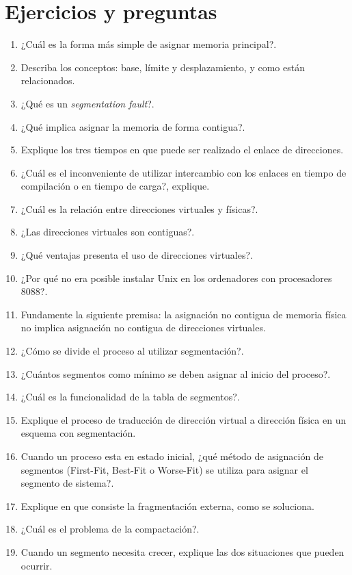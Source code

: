 \section{Ejercicios y preguntas}
\begin{enumerate}
	\item ¿Cuál es la forma más simple de asignar memoria principal?.
	\item Describa los conceptos: base, límite y desplazamiento, y como están relacionados.
	\item ¿Qué es un \textit{segmentation fault}?.
	\item ¿Qué implica asignar la memoria de forma contigua?.
	\item Explique los tres tiempos en que puede ser realizado el enlace de direcciones.
	\item ¿Cuál es el inconveniente de utilizar intercambio con los enlaces en tiempo de compilación o en tiempo de carga?, explique.
	\item ¿Cuál es la relación entre direcciones virtuales y físicas?.
	\item ¿Las direcciones virtuales son contiguas?.
	\item ¿Qué ventajas presenta el uso de direcciones virtuales?.
	\item ¿Por qué no era posible instalar Unix en los ordenadores con procesadores 8088?.
	\item Fundamente la siguiente premisa: la asignación no contigua de memoria física no implica asignación no contigua de direcciones virtuales.
	\item ¿Cómo se divide el proceso al utilizar segmentación?.
	\item ¿Cuántos segmentos como mínimo se deben asignar al inicio del proceso?.
	\item ¿Cuál es la funcionalidad de la tabla de segmentos?.
	\item Explique el proceso de traducción de dirección virtual a dirección física en un esquema con segmentación.
	\item Cuando un proceso esta en estado inicial, ¿qué método de asignación de segmentos (First-Fit, Best-Fit o Worse-Fit) se utiliza para asignar el segmento de sistema?.
	\item Explique en que consiste la fragmentación externa, como se soluciona.
	\item ¿Cuál es el problema de la compactación?.
	\item Cuando un segmento necesita crecer, explique las dos situaciones que pueden ocurrir.

\end{enumerate}
